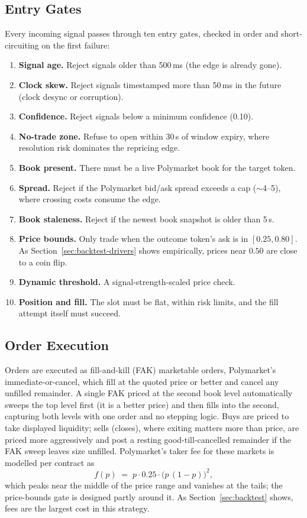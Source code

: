 \documentclass{tmsce}
\begin{document}
\subsection{Entry Gates}

Every incoming signal passes through ten entry gates, checked in order and
short-circuiting on the first failure:

\begin{enumerate}
  \item \textbf{Signal age.} Reject signals older than 500\,ms (the edge is already
        gone).
  \item \textbf{Clock skew.} Reject signals timestamped more than 50\,ms in the
        future (clock desync or corruption).
  \item \textbf{Confidence.} Reject signals below a minimum confidence (0.10).
  \item \textbf{No-trade zone.} Refuse to open within 30\,s of window expiry, where
        resolution risk dominates the repricing edge.
  \item \textbf{Book present.} There must be a live Polymarket book for the target
        token.
  \item \textbf{Spread.} Reject if the Polymarket bid/ask spread exceeds a cap
        ($\sim$4--5\textcent), where crossing costs consume the edge.
  \item \textbf{Book staleness.} Reject if the newest book snapshot is older than
        5\,s.
  \item \textbf{Price bounds.} Only trade when the outcome token's ask is in
        $[0.25, 0.80]$. As Section~\ref{sec:backtest-drivers} shows empirically,
        prices near $0.50$ are close to a coin flip.
  \item \textbf{Dynamic threshold.} A signal-strength-scaled price check.
  \item \textbf{Position and fill.} The slot must be flat, within risk limits, and
        the fill attempt itself must succeed.
\end{enumerate}

\subsection{Order Execution}

Orders are executed as fill-and-kill (FAK) marketable orders, Polymarket's
immediate-or-cancel, which fill at the quoted price or better and cancel any unfilled
remainder. A single FAK priced at the second book level automatically sweeps the top
level first (it is a better price) and then fills into the second, capturing both
levels with one order and no stepping logic. Buys are priced to take displayed
liquidity; sells (closes), where exiting matters more than price, are priced more
aggressively and post a resting good-till-cancelled remainder if the FAK sweep leaves
size unfilled. Polymarket's taker fee for these markets is modelled per contract as
\[
  f(p) \;=\; p \cdot 0.25 \cdot \big(p\,(1-p)\big)^{2},
\]
which peaks near the middle of the price range and vanishes at the tails; the
price-bounds gate is designed partly around it. As Section~\ref{sec:backtest} shows,
fees are the largest cost in this strategy.
\end{document}
